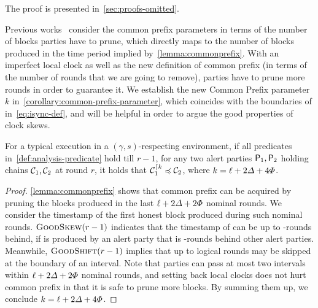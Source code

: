 \lemmacommonprefix

The proof is presented in~\cref{sec:proofs-omitted}.

Previous works~\cite{C:GarKiaLeo17,EPRINT:GarKiaLeo20} consider the common prefix parameters in terms of the number of blocks parties have to prune, which directly maps to the number of blocks produced in the time period implied by~\cref{lemma:commonprefix}.
%
With an imperfect local clock \funcImpClock as well as the new definition of common prefix (in terms of the number of rounds that we are going to remove), parties have to prune more rounds in order to guarantee it.
%
We establish the new Common Prefix parameter $k$ in~\cref{corollary:common-prefix-parameter}, which coincides with the \CPLen boundaries of \Isync{\cdot} in~\cref{eq:isync-def}, and will be helpful in order to argue the good properties of clock skews.

\begin{corollary} \label{corollary:common-prefix-parameter}
    For a typical execution in a $(\gamma, s)$-respecting environment, if all predicates in~\cref{def:analysis-predicate} hold till $r - 1$, for any two alert parties $\mathsf{P}_1, \mathsf{P}_2$ holding chains $\mathcal{C}_1, \mathcal{C}_2$ at round $r$, it holds that $\mathcal{C}_1^{\lceil k} \preccurlyeq \mathcal{C}_2$, where $k = \ell + 2\varDelta + 4\varPhi$.
\end{corollary}

\begin{proof}
    \cref{lemma:commonprefix} shows that common prefix can be acquired by pruning the blocks produced in the last $\ell + 2\varDelta + 2\varPhi$ nominal rounds.
    We consider the timestamp of the first honest block \block produced during such nominal rounds.
    $\textsc{GoodSkew}(r - 1)$ indicates that the timestamp of \block can be up to \maxskew-rounds behind, if \block is produced by an alert party that is \maxskew-rounds behind other alert parties.
    Meanwhile, $\textsc{GoodShift}(r - 1)$ implies that up to \maxskew logical rounds may be skipped at the boundary of an interval.
    Note that parties can pass at most two intervals within $\ell + 2\varDelta + 2\varPhi$ nominal rounds, and setting back local clocks does not hurt common prefix in that it is safe to prune more blocks.
    By summing them up, we conclude $k = \ell + 2\varDelta + 4\varPhi$.
\end{proof}

\lemmablocklength

